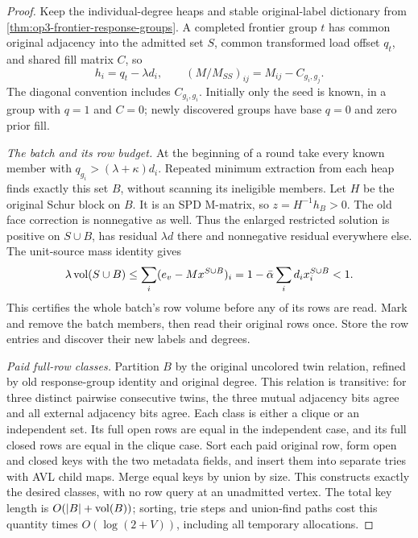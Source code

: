 \begin{proof}
Keep the individual-degree heaps and stable original-label dictionary
from \cref{thm:op3-frontier-response-groups}. A completed frontier group
$t$ has common original adjacency into the admitted set $S$, common
transformed load offset $q_t$, and shared fill matrix $C$, so
\[
 h_i=q_t-\lambda d_i,\qquad
 (M/M_{SS})_{ij}=M_{ij}-C_{g_i,g_j}.
\]
The diagonal convention includes $C_{g_i,g_i}$. Initially only the seed
is known, in a group with $q=1$ and $C=0$; newly discovered groups have
base $q=0$ and zero prior fill.

\emph{The batch and its row budget.}
At the beginning of a round take every known member with
$q_{g_i}>(\lambda+\kappa)d_i$. Repeated minimum extraction from each
heap finds exactly this set $B$, without scanning its ineligible members.
Let $H$ be the original Schur block on $B$. It is an SPD M-matrix, so
$z=H^{-1}h_B>0$. The old face correction is nonnegative as well.
Thus the enlarged restricted solution is positive on $S\cup B$, has
residual $\lambda d$ there and nonnegative residual everywhere else.
The unit-source mass identity gives
\[
 \lambda\operatorname{vol}(S\cup B)\leq\sum_i(e_v-Mx^{S\cup B})_i
 =1-\bar\alpha\sum_i d_i x_i^{S\cup B}<1.
\]
This certifies the whole batch's row volume before any of its rows are
read. Mark and remove the batch members, then read their original rows
once. Store the row entries and discover their new labels and degrees.

\emph{Paid full-row classes.}
Partition $B$ by the original uncolored twin relation, refined by old
response-group identity and original degree. This relation is transitive:
for three distinct pairwise consecutive twins, the three mutual adjacency
bits agree and all external adjacency bits agree. Each class is either
a clique or an independent set. Its full open rows are equal in the
independent case, and its full closed rows are equal in the clique case.
Sort each paid original row, form open and closed keys with the two
metadata fields, and insert them into separate tries with AVL child maps.
Merge equal keys by union by size. This constructs exactly the desired
classes, with no row query at an unadmitted vertex. The total key length
is $O(|B|+\operatorname{vol}(B))$; sorting, trie steps and union-find paths cost this
quantity times $O(\log(2+V))$, including all temporary allocations.


\end{proof}
